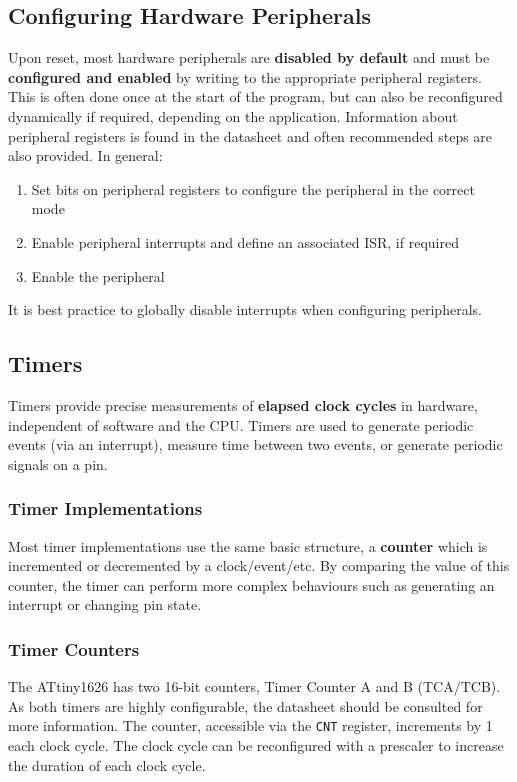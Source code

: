 \documentclass{article}
\begin{document}
\subsection{Configuring Hardware Peripherals}
Upon reset, most hardware peripherals are \textbf{disabled by default}
and must be \textbf{configured and enabled} by writing to the
appropriate peripheral registers. This is often done once at the start
of the program, but can also be reconfigured dynamically if required,
depending on the application. Information about peripheral registers is
found in the datasheet and often recommended steps are also provided. In
general:
\begin{enumerate}
    \item Set bits on peripheral registers to configure the peripheral
          in the correct mode
    \item Enable peripheral interrupts and define an associated ISR, if
          required
    \item Enable the peripheral
\end{enumerate}
It is best practice to globally disable interrupts when configuring
peripherals.
\subsection{Timers}
Timers provide precise measurements of \textbf{elapsed clock cycles} in
hardware, independent of software and the CPU\@. Timers are used to
generate periodic events (via an interrupt), measure time between two
events, or generate periodic signals on a pin.
\subsubsection{Timer Implementations}
Most timer implementations use the same basic structure, a
\textbf{counter} which is incremented or decremented by a
clock/event/etc. By comparing the value of this counter, the timer can
perform more complex behaviours such as generating an interrupt or
changing pin state.
\subsubsection{Timer Counters}
The ATtiny1626 has two 16-bit counters, Timer Counter A and B (TCA/TCB).
As both timers are highly configurable, the datasheet should be
consulted for more information. The counter, accessible via the
\texttt{CNT} register, increments by 1 each clock cycle. The
clock cycle can be reconfigured with a prescaler to increase the
duration of each clock cycle.
\end{document}
